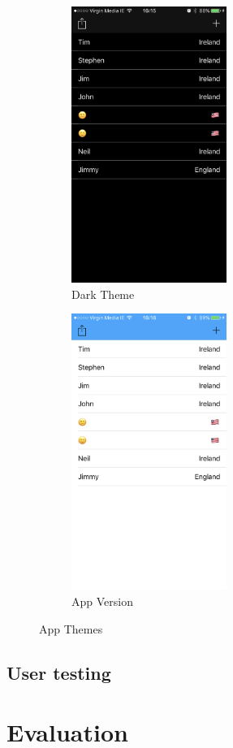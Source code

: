 \begin{figure}[!h]
    \begin{subfigure}{0.5\textwidth}
        \includegraphics[width=0.8\linewidth, height=9cm]{images/testing/darkTheme}
        \caption{Dark Theme}
        \label{fig:dark-theme}
    \end{subfigure}
    \begin{subfigure}{0.5\textwidth}
        \includegraphics[width=0.8\linewidth, height=9cm]{images/testing/lightTheme}
        \caption{App Version}
        \label{fig:light-theme}
    \end{subfigure}
\caption{App Themes}
\label{fig:app-themes}
\end{figure}


\subsection{User testing}

\section{Evaluation}

